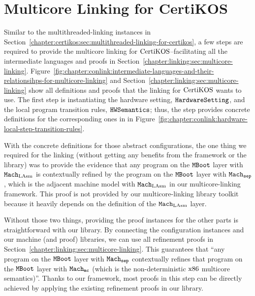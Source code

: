\section{Multicore Linking for CertiKOS}
\label{chapter:certikos:sec:multicore-linking-for-certikos}

Similar to the multithreaded-linking instances in Section~\ref{chapter:certikos:sec:multithreaded-linking-for-certikos}, a few steps are required  to provide the multicore linking for $\mathrm{CertiKOS}$--facilitating all the intermediate languages
and proofs in Section~\ref{chapter:linking:sec:multicore-linking}.
Figure~\ref{fig:chapter:conlink:intermediate-languages-and-their-relationsihps-for-multicore-linking} and 
Section~\ref{chapter:linking:sec:multicore-linking} show all definitions and 
proofs that the linking for $\mathrm{CertiKOS}$ wants to use. 
The first step is instantiating the hardware setting, ${{\mathrm{\texttt{HardwareSetting}}}}$, and the local program transition rules, ${{\mathrm{\texttt{HWSemantics}}}}$;
thus, the step provides concrete definitions for the corresponding ones in 
 in Figure~\ref{fig:chapter:conlink:hardware-local-step-transition-rules}.

With the concrete definitions for those abstract configurations, 
the one thing  we required for the linking (without getting any benefits from the framework or the library)
was to provide the evidence that any program on the ${\mathrm{\texttt{MBoot}}}$ layer with ${\mathrm{\texttt{Mach}}}_{\mathrm{LAsm}}$ is contextually refined by the program on the ${\mathrm{\texttt{MBoot}}}$ layer with ${{{\mathrm{\texttt{Mach}}}}_{{\mathrm{\texttt{sep}}}}}$, which is the adjacent machine model with ${\mathrm{\texttt{Mach}}}_{\mathrm{LAsm}}$ in our multicore-linking framework. This proof is not provided by our multicore-linking library toolkit because it heavily depends on the definition of the ${\mathrm{\texttt{Mach}}}_{\mathrm{LAsm}}$ layer.

Without those two things, 
providing the proof instances for the other parts is straightforward with our library. 
By connecting the configuration instances and our machine (and proof) libraries, 
we can use all refinement proofs in Section~\ref{chapter:linking:sec:multicore-linking}. 
This guarantees that ``any program on the ${\mathrm{\texttt{MBoot}}}$ layer with ${{{\mathrm{\texttt{Mach}}}}_{{\mathrm{\texttt{sep}}}}}$ contextually refines that program on the ${\mathrm{\texttt{MBoot}}}$ layer with ${{{{\mathrm{\texttt{Mach}}}}_{\mathrm{\texttt{mc}}}}}$ (which is the non-deterministic $\mathrm{x86}$ multicore semantics)''.
Thanks to our framework, most proofs in this step can be directly achieved by applying the existing refinement proofs in our library.
%
